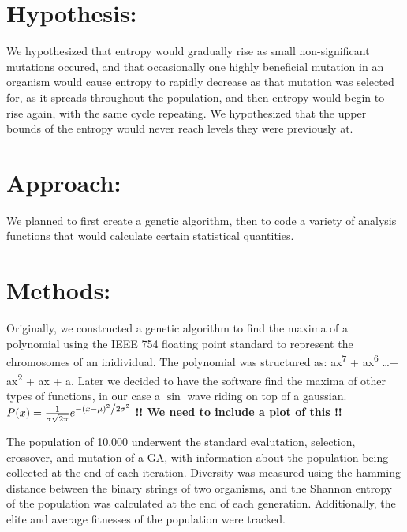\documentclass[11pt]{article}
\begin{document}
\section{Hypothesis:}
\label{sec:org26a3be1}
We hypothesized that entropy would gradually rise as small non-significant
mutations occured, and that occasionally one highly beneficial mutation in
an organism would cause entropy to rapidly decrease as that mutation was
selected for, as it spreads throughout the population, and then entropy would
begin to rise again, with the same cycle repeating. We hypothesized that the
upper bounds of the entropy would never reach levels they were previously at.

\section{Approach:}
\label{sec:org8c588e5}
We planned to first create a genetic algorithm, then to code a variety of
analysis functions that would calculate certain statistical quantities.

\section{Methods:}
\label{sec:org2c55902}
Originally, we constructed a genetic algorithm to find the maxima of a
polynomial using the IEEE 754 floating point standard to represent the
chromosomes of an inidividual. The polynomial was structured as: ax\textsuperscript{7}
+ ax\textsuperscript{6} \ldots + ax\textsuperscript{2} + ax + a. Later we
decided to have the software find the maxima of other types of functions,
in our case a $\sin$ wave riding on top of a gaussian. $ P(x) = \frac{1}{{\sigma \sqrt {2\pi } }} e^{{{ - \left( {x - \mu} \right)^2 } \mathord{\left/ {\vphantom {{ - \left( {x - \mu } \right)^2 } {2\sigma ^2 }}} \right. \kern-\nulldelimiterspace} {2\sigma ^2 }}} $
\color{red} \textbf{!! We need to include a plot of this !!}
\color{black}

The population of 10,000 underwent the standard evalutation, selection,
crossover, and mutation of a  GA, with information about the population
being collected at the end of each iteration. Diversity was measured using
the hamming distance between the binary strings of two organisms, and the
Shannon entropy of the population was calculated at the end of each generation.
Additionally, the elite and average fitnesses of the population were tracked.
\end{document}
